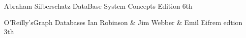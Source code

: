  \begin{thebibliography}{99}

\begin{LTRitems}
\resetlatinfont
{}
Abraham Silberschatz DataBase System Concepts Edition 6th


O'Reilly'sGraph Databases Ian Robinson & Jim Webber & Emil Eifrem edtion 3th

\end{LTRitems}

\end{thebibliography}
 


